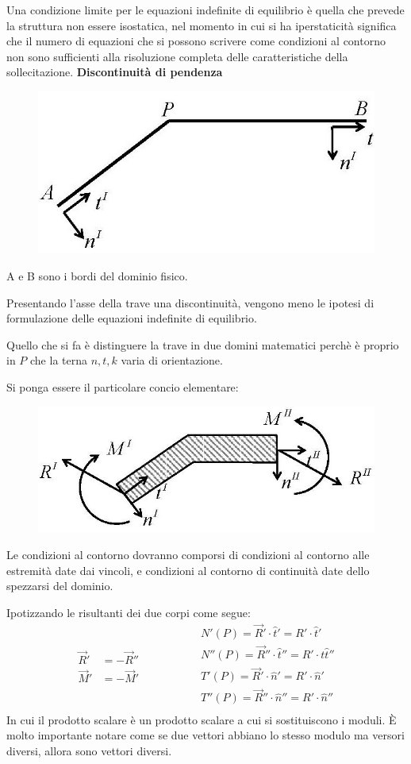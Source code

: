 \documentclass{article}
\begin{document}
\begin{adjustwidth}{2in}{}
 	Una condizione limite per le equazioni indefinite di equilibrio è quella che prevede la struttura non essere isostatica, nel momento in cui si ha iperstaticità significa che il numero di equazioni che si possono scrivere come condizioni al contorno non sono sufficienti alla risoluzione completa delle caratteristiche della sollecitazione. \newline
\newpage 
\textbf{Discontinuità di pendenza} 

\begin{figure}[H]
	\centering
	\includegraphics[width=0.2\linewidth]{"immagini/1.PARTE5_Pagina_15"}
\end{figure}
	 A e B sono i bordi del dominio fisico.
 
 	Presentando l’asse della trave una discontinuità, vengono meno le ipotesi di formulazione  delle
	equazioni indefinite di equilibrio. 
 
 	Quello che si fa è distinguere la trave in due domini matematici perchè è proprio in $P$ che la terna $n, t, k$ varia di orientazione. 
 
 	Si ponga essere il particolare concio elementare:
 	
\begin{figure}[H]
	\centering
	\includegraphics[width=0.3\linewidth]{"immagini/1.PARTE5_Pagina_16"}
\end{figure}
Le condizioni al contorno dovranno comporsi di condizioni al contorno alle estremità date dai vincoli, e condizioni al contorno di continuità date dello spezzarsi del dominio. \newline

	Ipotizzando le risultanti dei due corpi come segue:
	\[
	\begin{split}
		\vec{R}' & = -\vec{R}''  \\
		\vec{M}' & = -\vec{M}'
	\end{split} \hspace{2cm} \begin{split}
		N'(P) = \vec{R}' \cdot \hat{t}' = R'\cdot \hat{t}' \\
		N''(P) = \vec{R}'' \cdot \hat{t}'' = R'\cdot t\hat{t}'' \\
		T'(P) = \vec{R}' \cdot \hat{n}' = R'\cdot \hat{n}' \\
		T''(P) = \vec{R}'' \cdot \hat{n}'' = R'\cdot \hat{n}''  \\
	\end{split}		
	\]	
	In cui il prodotto scalare è un prodotto scalare a cui si sostituiscono i moduli. È molto importante notare come se due vettori abbiano lo stesso modulo ma versori diversi, allora sono vettori diversi. \newline
	

\end{adjustwidth}
\end{document}
